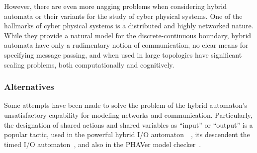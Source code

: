 However, there are even more nagging problems when considering hybrid automata or their variants
for the study of cyber physical systems. One of the hallmarks of cyber physical systems is a
distributed and highly networked nature. While they provide a
natural model for the discrete-continuous boundary, hybrid automata have only a rudimentary
notion of communication, no clear means for specifying message passing, and when used in large
topologies have significant scaling problems, both computationally and cognitively.
\subsubsection{Alternatives}
Some attempts have been made to solve the problem of the hybrid automaton's unsatisfactory
capability for modeling networks and communication. Particularly, the designation of shared
actions and shared variables as ``input'' or ``output'' is a popular tactic, used in the
powerful hybrid I/O automaton~\cite{lynch1996hybrid}~\cite{lynch2001hybrid}, its descendent the
timed I/O automaton~\cite{kaynar2010theory}, and also in the PHAVer model 
checker~\cite{frehse2005phaver}.

